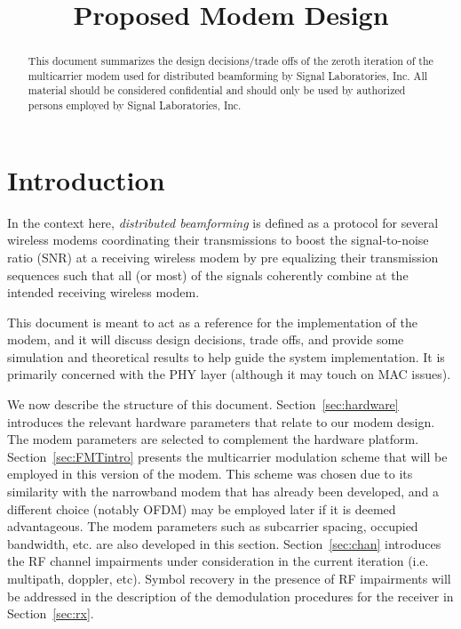 \documentclass[conference]{IEEEtran}
\begin{document}
\title{Proposed Modem Design}
\author{
}

\maketitle

\begin{abstract}
This document summarizes the design decisions/trade offs of the zeroth
iteration of the multicarrier modem used for distributed beamforming by
Signal Laboratories, Inc. All material should be considered confidential
and should only be used by authorized persons employed by Signal
Laboratories, Inc.
\end{abstract}

\section{Introduction}
\label{sec:intro}

In the context here, \emph{distributed beamforming} is defined as a
protocol for several wireless modems coordinating their transmissions
to boost the signal-to-noise ratio (SNR) at a receiving wireless modem
by pre equalizing their transmission sequences such that all (or most)
of the signals coherently combine at the intended receiving wireless modem.

This document is meant to act as a reference for the implementation
of the modem, and it will discuss design decisions, trade offs, and
provide some simulation and theoretical results to help guide the
system implementation. It is primarily concerned with the PHY layer
(although it may touch on MAC issues).

We now describe the structure of this document. Section~\ref{sec:hardware}
introduces the relevant hardware parameters that relate to our modem
design. The modem parameters are selected to complement the hardware
platform. Section~\ref{sec:FMTintro} presents the multicarrier modulation
scheme that will be employed in this version of the modem. This scheme was
chosen due to its similarity with the narrowband modem that has already been
developed, and a different choice (notably OFDM) may be employed
later if it is deemed advantageous. The modem parameters such as subcarrier
spacing, occupied bandwidth, etc. are also developed in this section.
Section~\ref{sec:chan} introduces the RF channel impairments under
consideration in the current iteration (i.e. multipath, doppler, etc).
Symbol recovery in the presence of RF impairments will be addressed in
the description of the demodulation procedures for the receiver in
Section~\ref{sec:rx}.
\end{document}

